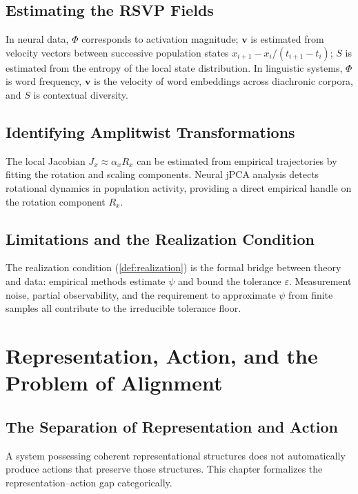 \documentclass[12pt,a4paper,oneside]{book}
\numberwithin{equation}{chapter}
\theoremstyle{plain}
\theoremstyle{definition}
\theoremstyle{remark}
\begin{document}
\section{Estimating the RSVP Fields}

In neural data, $\Phi$ corresponds to activation magnitude; $\mathbf{v}$
is estimated from velocity vectors between successive population
states $x_{i+1} - x_i/(t_{i+1}-t_i)$; $S$ is estimated from the
entropy of the local state distribution. In linguistic systems, $\Phi$
is word frequency, $\mathbf{v}$ is the velocity of word embeddings
across diachronic corpora, and $S$ is contextual diversity.

\section{Identifying Amplitwist Transformations}

The local Jacobian $J_x \approx \alpha_x R_x$ can be estimated from
empirical trajectories by fitting the rotation and scaling components.
Neural jPCA analysis \cite{dicarlo2015} detects rotational dynamics
in population activity, providing a direct empirical handle on the
rotation component $R_x$.

\section{Limitations and the Realization Condition}

The realization condition (\cref{def:realization}) is the formal
bridge between theory and data: empirical methods estimate $\psi$ and
bound the tolerance $\varepsilon$. Measurement noise, partial
observability, and the requirement to approximate $\psi$ from finite
samples all contribute to the irreducible tolerance floor.


\chapter[Representation, Action, and Alignment]{Representation, Action, and the Problem of Alignment}
\label{ch:alignment}

\section{The Separation of Representation and Action}

A system possessing coherent representational structures does not
automatically produce actions that preserve those structures. This
chapter formalizes the representation--action gap categorically.
\end{document}
